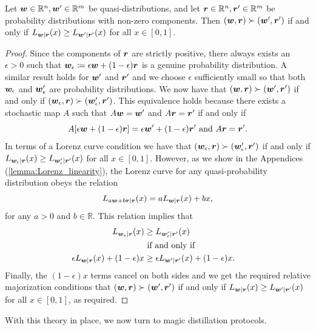\documentclass[pra,
aps,
twocolumn,
superscriptaddress,
groupedaddress,
nofootinbib,
reprint
]{revtex4-1}
\begin{document}
\begin{theorem}\label{thm:lcquasi}
	Let $\boldsymbol{w} \in \mathbb{R}^n,\boldsymbol{w}'\in \mathbb{R}^m$ be quasi-distributions, and let $\boldsymbol{r} \in \mathbb{R}^n, \boldsymbol{r}' \in \mathbb{R}^m$ be probability distributions with non-zero components. Then $(\boldsymbol{w}, \boldsymbol{r}) \succ (\boldsymbol{w}', \boldsymbol{r}')$ if and only if $L_{\boldsymbol{w}|\boldsymbol{r}}(x) \ge L_{\boldsymbol{w}' |\boldsymbol{r}'}(x)$ for all $x \in [0,1]$.
\end{theorem}
\begin{proof}
	Since the components of $\boldsymbol{r}$ are strictly positive, there always exists an $\epsilon >0$ such that $\boldsymbol{w}_\epsilon \coloneqq \epsilon \boldsymbol{w} + (1-\epsilon) \boldsymbol{r}$ is a genuine probability distribution. A similar result holds for $\boldsymbol{w}'$ and $\boldsymbol{r}'$ and we choose $\epsilon$ sufficiently small so that both $\boldsymbol{w}_\epsilon$ and $\boldsymbol{w}_\epsilon'$ are probability distributions. We now have that $(\boldsymbol{w} , \boldsymbol{r}) \succ (\boldsymbol{w}', \boldsymbol{r}')$ if and only if $(\boldsymbol{w}_\epsilon , \boldsymbol{r}) \succ (\boldsymbol{w}_\epsilon', \boldsymbol{r}')$. This equivalence holds because there exists a stochastic map $A$ such that $A \boldsymbol{w} = \boldsymbol{w}'$ and $A \boldsymbol{r} = \boldsymbol{r}'$ if and only if 
\begin{equation}
A[\epsilon \boldsymbol{w} + (1-\epsilon) \boldsymbol{r}] = \epsilon \boldsymbol{w}' + (1-\epsilon) \boldsymbol{r}'\mbox{ and } A\boldsymbol{r} = \boldsymbol{r}'.
\end{equation}
In terms of a Lorenz curve condition we have that $(\boldsymbol{w}_\epsilon , \boldsymbol{r}) \succ (\boldsymbol{w}_\epsilon', \boldsymbol{r}')$ if and only if $L_{\boldsymbol{w}_\epsilon |\boldsymbol{r}} (x) \ge L_{\boldsymbol{w}'_\epsilon |\boldsymbol{r}'} (x)$ for all $x \in [0,1]$. 
However, as we show in the Appendices (\cref{lemma:Lorenz_linearity}), the Lorenz curve for any quasi-probability distribution obeys the relation
\begin{equation}
L_{a \boldsymbol{w} + b \boldsymbol{r} | \boldsymbol{r}} (x) = a L_{\boldsymbol{w}|\boldsymbol{r}} (x) + bx,
\end{equation}
for any $a >0$ and $b \in \mathbb{R}$. This relation implies that
\begin{align}
L_{\boldsymbol{w}_\epsilon |\boldsymbol{r}} (x) &\ge L_{\boldsymbol{w}'_\epsilon |\boldsymbol{r}'} (x) \nonumber \\ 
&\mbox{ if and only if }& \nonumber \\
\epsilon L_{\boldsymbol{w} |\boldsymbol{r}} (x) + (1-\epsilon) x &\ge \epsilon L_{\boldsymbol{w}' |\boldsymbol{r}'} (x) + (1-\epsilon) x.
\end{align}
Finally, the $(1-\epsilon)x$ terms cancel on both sides and we get the required relative majorization conditions that $(\boldsymbol{w}, \boldsymbol{r}) \succ (\boldsymbol{w}', \boldsymbol{r}')$ if and only if $L_{\boldsymbol{w} | \boldsymbol{r}} (x) \ge L_{\boldsymbol{w}' | \boldsymbol{r}'}(x)$ for all $x \in [0,1]$, as required.
\end{proof}

With this theory in place, we now turn to magic distillation protocols.
\end{document}
